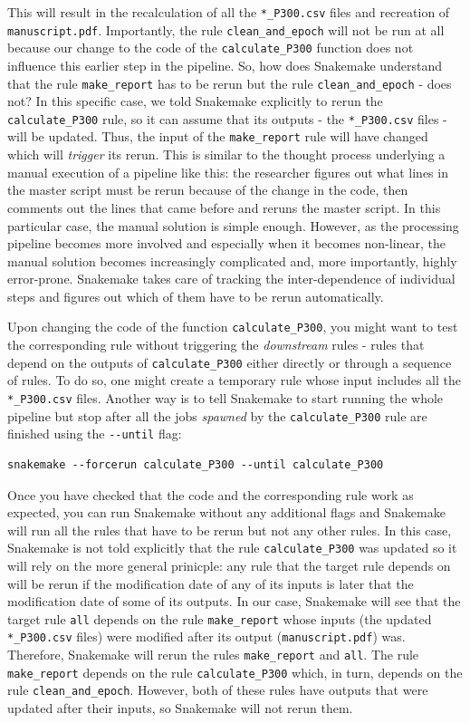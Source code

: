 \documentclass[a4paper,man,floatsintext,natbib]{apa6}
\begin{document}
This will result in the recalculation of all the \verb|*_P300.csv| files and recreation of \verb|manuscript.pdf|. Importantly, the rule \verb|clean_and_epoch| will not be run at all because our change to the code of the \verb|calculate_P300| function does not influence this earlier step in the pipeline. So, how does Snakemake understand that the rule \verb|make_report| has to be rerun but the rule \verb|clean_and_epoch| - does not? In this specific case, we told Snakemake explicitly to rerun the \verb|calculate_P300| rule, so it can assume that its outputs - the  \verb|*_P300.csv| files - will be updated. Thus, the input of the \verb|make_report| rule will have changed which will \emph{trigger} its rerun. This is similar to the thought process underlying a manual execution of a pipeline like this: the researcher figures out what lines in the master script must be rerun because of the change in the code, then comments out the lines that came before and reruns the master script. In this particular case, the manual solution is simple enough. However, as the processing pipeline becomes more involved and especially when it becomes non-linear, the manual solution becomes increasingly complicated and, more importantly, highly error-prone. Snakemake takes care of tracking the inter-dependence of individual steps and figures out which of them have to be rerun automatically.

Upon changing the code of the function  \verb|calculate_P300|, you might want to test the corresponding rule without triggering the \emph{downstream} rules - rules that depend on the outputs of  \verb|calculate_P300| either directly or through a sequence of rules. To do so, one might create a temporary rule whose input includes all the  \verb|*_P300.csv| files. Another way is to tell Snakemake to start running the whole pipeline but stop after all the jobs \emph{spawned} by the  \verb|calculate_P300| rule are finished using the \verb|--until| flag:

\begin{verbatim}
snakemake --forcerun calculate_P300 --until calculate_P300
\end{verbatim}

Once you have checked that the code and the corresponding rule work as expected, you can run Snakemake without any additional flags and Snakemake will run all the rules that have to be rerun but not any other rules. In this case, Snakemake is not told explicitly that the rule \verb|calculate_P300| was updated so it will rely on the more general prinicple: any rule that the target rule depends on will be rerun if the modification date of any of its inputs is later that the modification date of some of its outputs. In our case, Snakemake will see that the target rule \verb|all| depends on the rule \verb|make_report| whose inputs (the updated \verb|*_P300.csv| files) were modified after its output (\verb|manuscript.pdf|) was. Therefore, Snakemake will rerun the rules \verb|make_report| and \verb|all|. The rule \verb|make_report| depends on the rule \verb|calculate_P300| which, in turn, depends on the rule \verb|clean_and_epoch|. However, both of these rules have outputs that were updated after their inputs, so Snakemake will not rerun them. 
\end{document}
